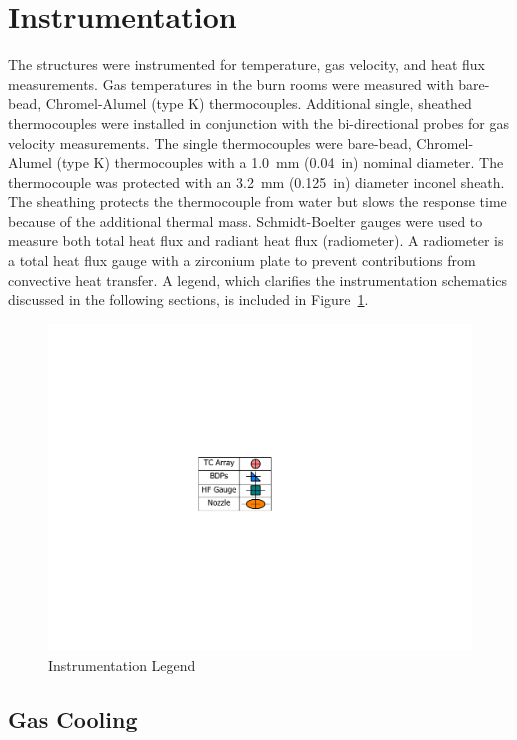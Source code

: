 \documentclass[12pt,oneside]{book}
\begin{document}
\clearpage

\section{Instrumentation}
\label{sec:Instrumentation}

The structures were instrumented for temperature, gas velocity, and heat flux measurements. Gas temperatures in the burn rooms were measured with bare-bead, Chromel-Alumel (type K) thermocouples. Additional single, sheathed thermocouples were installed in conjunction with the bi-directional probes for gas velocity measurements. The single thermocouples were bare-bead, Chromel-Alumel (type K) thermocouples with a 1.0~mm (0.04~in) nominal diameter. The thermocouple was protected with an 3.2~mm (0.125~in) diameter inconel sheath. The sheathing protects the thermocouple from water but slows the response time because of the additional thermal mass. Schmidt-Boelter gauges were used to measure both total heat flux and radiant heat flux (radiometer). A radiometer is a total heat flux gauge with a zirconium plate to prevent contributions from convective heat transfer. A legend, which clarifies the instrumentation schematics discussed in the following sections, is included in Figure~\ref{fig:Instrumentation_Legend}.

\begin{figure}[!ht]
	\includegraphics[width=.35\columnwidth]{../Figures/Floor_Plans/PDFs/DelCo_2012_Instrumentation_Legend}
	\caption{Instrumentation Legend}
	\label{fig:Instrumentation_Legend}
\end{figure}

\subsection{Gas Cooling}
\label{subsec:Gas_Cooling_Instrumentation}
\end{document}
